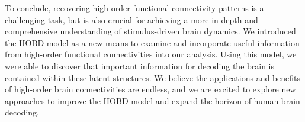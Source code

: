 \documentclass[11pt]{article}
\begin{document}
To conclude, recovering high-order functional connectivity patterns is a challenging task, but is also crucial for achieving a more in-depth and comprehensive understanding of stimulus-driven brain dynamics. We introduced the HOBD model as a new means to examine and incorporate useful information from high-order functional connectivities into our analysis. Using this model, we were able to discover that important information for decoding the brain is contained within these latent structures. We believe the applications and benefits of high-order brain connectivities are endless, and we are excited to explore new approaches to improve the HOBD model and expand the horizon of human brain decoding.

\newpage


\end{document}
